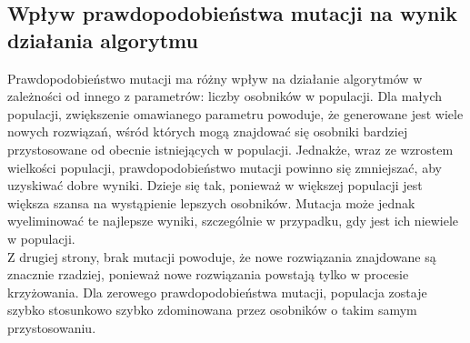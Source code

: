 \documentclass[a4paper,11pt]{article}
\begin{document}
		\subsection{Wpływ prawdopodobieństwa mutacji na wynik działania algorytmu}
		Prawdopodobieństwo mutacji ma różny wpływ na działanie algorytmów w zależności od innego z parametrów: liczby osobników w populacji. Dla małych populacji, zwiększenie omawianego parametru powoduje, że generowane jest wiele nowych rozwiązań, wśród których mogą znajdować się osobniki bardziej przystosowane od obecnie istniejących w populacji. Jednakże, wraz ze wzrostem wielkości populacji, prawdopodobieństwo mutacji powinno się zmniejszać, aby uzyskiwać dobre wyniki. Dzieje się tak, ponieważ w większej populacji jest większa szansa na wystąpienie lepszych osobników. Mutacja może jednak wyeliminować te najlepsze wyniki, szczególnie w przypadku, gdy jest ich niewiele w populacji. \\
		Z drugiej strony, brak mutacji powoduje, że nowe rozwiązania znajdowane są znacznie rzadziej, ponieważ nowe rozwiązania powstają tylko w procesie krzyżowania. Dla zerowego prawdopodobieństwa mutacji, populacja zostaje szybko stosunkowo szybko zdominowana przez osobników o takim samym przystosowaniu.
	
\end{document}
